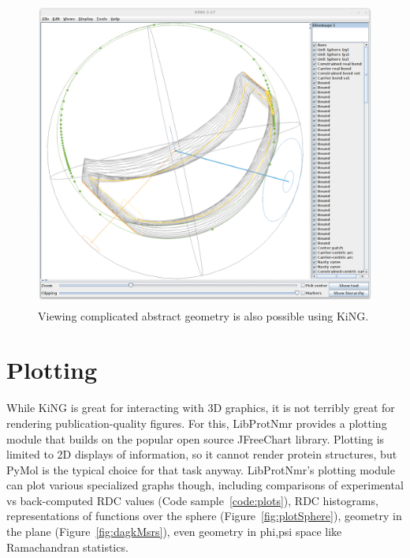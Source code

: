 \documentclass[11pt]{article}
\newcommand{\software}[1]{{\sc #1}}
\newcommand{\figref}[1]{Figure~\ref{#1}}
\newcommand{\coderef}[1]{Code sample~\ref{#1}}
\newcommand{\libprotnmr}{\software{LibProtNmr}}
\begin{document}
\begin{figure}
	\centering
	\includegraphics[height=4in]{figures/kingAdvanced}
	\caption{
		Viewing complicated abstract geometry is also possible using KiNG.
	}
	\label{fig:kingAdvanced}
\end{figure}


\section{Plotting}

While KiNG is great for interacting with 3D graphics, it is not terribly great for rendering publication-quality figures. For this, {\libprotnmr} provides a plotting module that builds on the popular open source \software{JFreeChart} library. Plotting is limited to 2D displays of information, so it cannot render protein structures, but \software{PyMol} is the typical choice for that task anyway. {\libprotnmr}'s plotting module can plot various specialized graphs though, including comparisons of experimental vs back-computed RDC values (\coderef{code:plots}), RDC histograms, representations of functions over the sphere (\figref{fig:plotSphere}), geometry in the plane (\figref{fig:dagkMsrs}), even geometry in phi,psi space like Ramachandran statistics.
\end{document}
